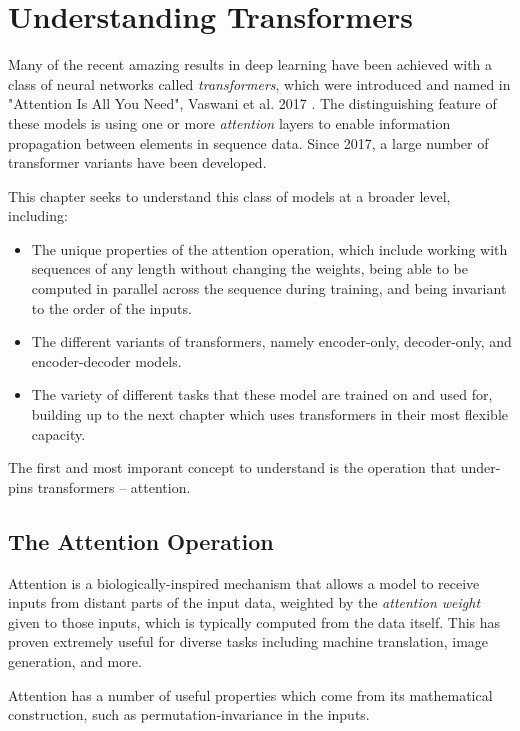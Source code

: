 \chapter{Understanding Transformers}
\label{C:transformers}

Many of the recent amazing results in deep learning have been achieved with a class of neural networks called \textit{transformers}, which were introduced and named in "Attention Is All You Need", Vaswani et al. 2017 \cite{attention-is-all-you-need}. The distinguishing feature of these models is using one or more \textit{attention} layers to enable information propagation between elements in sequence data. Since 2017, a large number of transformer variants have been developed.

This chapter seeks to understand this class of models at a broader level, including:
\begin{itemize}
    \item The unique properties of the attention operation, which include working with sequences of any length without changing the weights, being able to be computed in parallel across the sequence during training, and being invariant to the order of the inputs.
    \item The different variants of transformers, namely encoder-only, decoder-only, and encoder-decoder models.
    \item The variety of different tasks that these model are trained on and used for, building up to the next chapter which uses transformers in their most flexible capacity.
\end{itemize}

The first and most imporant concept to understand is the operation that under-pins transformers -- attention.
\section{The Attention Operation}
\label{S:attn}

Attention is a biologically-inspired mechanism that allows a model to receive inputs from distant parts of the input data, weighted by the \textit{attention weight} given to those inputs, which is typically computed from the data itself. This has proven extremely useful for diverse tasks including machine translation, image generation, and more.

Attention has a number of useful properties which come from its mathematical construction, such as permutation-invariance in the inputs.

